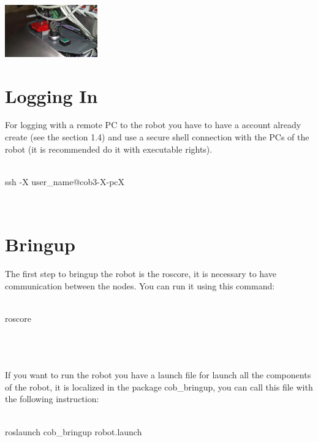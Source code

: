 \begin{center}
\includegraphics[width=0.3\textwidth]{images/key.png}
\end{center}
\section{Logging In}

For logging with a remote PC to the robot you have to have a account already create  (see the section 1.4) and use a secure shell connection with the PCs of the robot (it is recommended do it with executable rights).
\\
\\   \colorbox{light-gray}{
         \begin{minipage}{1.0\textwidth} 
		ssh -X user\_name@cob3-X-pcX
         \end{minipage}  } \\

\section{Bringup}

The first step to bringup the robot is the roscore, it is necessary  to have communication between the nodes. You can run it using this command: \\
\\   \colorbox{light-gray}{
         \begin{minipage}{1.0\textwidth} 
		roscore
         \end{minipage}  } \\
	\\
\\If you want to run the robot you have a launch file for launch all the components of the robot, it is localized in the package cob\_bringup, you can call this file  with the following instruction:
\\
\\   \colorbox{light-gray}{
         \begin{minipage}{1.0\textwidth} 
		roslaunch cob\_bringup robot.launch
         \end{minipage}  } \\


